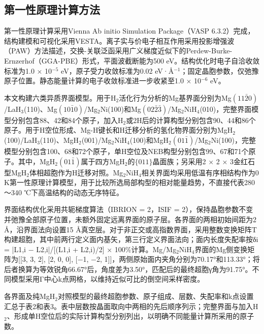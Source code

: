 \documentclass[preprint,12pt]{elsarticle}
\begin{document}
\subsection{第一性原理计算方法}

第一性原理计算采用Vienna Ab initio Simulation Package（VASP 6.3.2）完成\cite{ref18}，结构建模和可视化采用VESTA\cite{ref19}。离子实与价电子相互作用采用投影增强波（PAW）方法描述\cite{ref20,ref21}，交换-关联泛函采用广义梯度近似下的Perdew-Burke-Ernzerhof（GGA-PBE）形式\cite{ref22}，平面波截断能为500 eV。结构优化时电子自洽收敛标准为1.0 × 10$^{-5}$ eV，原子受力收敛标准为0.02 eV·Å$^{-1}$；固定晶胞参数，仅弛豫原子位置。静态能量计算的电子收敛标准进一步收紧至1.0 × 10$^{-6}$ eV。

本文构建六类异质界面模型。用于H$_{\mathrm{2}}$活化行为分析的Mg基界面分别为Mg$(11\bar{2}0)$/LaH$_{\mathrm{3}}$(110)、Mg$(10\bar{1}0)$/Mg$_{\mathrm{2}}$Ni(100)和Mg$(02\bar{2}\bar{3})$/Mg$_{\mathrm{2}}$NiH$_{\mathrm{4}}$(010)，完整界面模型分别包含88、42和84个原子，加入H$_{\mathrm{2}}$或2H后的计算构型分别包含90、44和86个原子。用于H空位形成、Mg-H键长和H迁移分析的氢化物界面分别为MgH$_{\mathrm{2}}$(100)/LaH$_{\mathrm{3}}$(110)、MgH$_{\mathrm{2}}$(001)/Mg$_{\mathrm{2}}$NiH$_{\mathrm{4}}$(100)和MgH$_{\mathrm{2}}$$(01\bar{1})$/Mg$_{\mathrm{2}}$Ni(100)，完整模型分别包含100、68和72个原子，单H空位及NEB构型分别包含99、67和71个原子。其中，MgH$_{\mathrm{2}}$$(01\bar{1})$属于四方MgH$_{\mathrm{2}}$的$\{011\}$晶面族；另采用2 × 2 × 3金红石型MgH$_{\mathrm{2}}$体相超胞作为H迁移对照。Mg$_{\mathrm{2}}$NiH$_{\mathrm{4}}$相关界面均采用低温有序相结构作为0 K第一性原理计算模型，用于比较所选局部构型的相对能量趋势，不直接代表280～340 ℃下高温结构的动态无序特征。

界面结构优化采用共轭梯度算法（IBRION = 2，ISIF = 2），保持晶胞参数不变并弛豫全部原子位置，未额外固定远离界面的原子层。各界面的两相初始间距为2 Å，沿界面法向设置15 Å真空层。对于非正交或高指数界面，采用整数变换矩阵T构建超胞，其中前两行定义面内基矢，第三行定义界面法向；面内长度失配率按δi = |L1,i − L2,i|/[(L1,i + L2,i)/2] × 100\%计算。Mg/Mg$_{\mathrm{2}}$NiH$_{\mathrm{4}}$界面的Mg侧变换矩阵为[[3, 3, 2], [2, 0, 0], [−1, −2, 1]]，两侧原始面内夹角分别为70.17°和113.33°；将后者换算为等效锐角66.67°后，角度差为3.50°，匹配后的最终超胞γ角为91.75°。不同模型采用Γ中心k点网格，以维持近似可比的倒空间采样密度。

各界面及纯MgH$_{\mathrm{2}}$对照模型的最终超胞参数、原子组成、层数、失配率和k点设置汇总于表2和表3。表中层数按晶面取向中两相的先后顺序列示；完整界面与加入H$_{\mathrm{2}}$、形成单H空位后的实际计算构型分别列出，以明确不同能量计算所采用的原子数。
\end{document}
